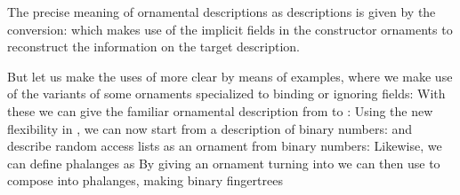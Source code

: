 The precise meaning of ornamental descriptions as descriptions is given by the conversion:
which makes use of the implicit  fields in the constructor ornaments to reconstruct the information on the target description.

But let us make the uses of  more clear by means of examples, where we make use of the variants of some ornaments specialized to binding or ignoring fields:
With these we can give the familiar ornamental description from  to :
Using the new flexibility in , we can now start from a description of binary numbers:
and describe random access lists as an ornament from binary numbers:
Likewise, we can define phalanges as
By giving an ornament turning  into 
we can then use  to compose  into phalanges, making binary fingertrees
